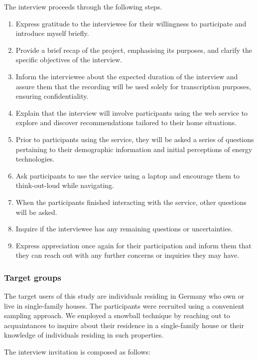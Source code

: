 The interview proceeds through the following steps.
\begin{enumerate}
  \item Express gratitude to the interviewee for their willingness to participate and introduce myself briefly.
  \item Provide a brief recap of the project, emphasising its purposes, and clarify the specific objectives of the interview.
  \item Inform the interviewee about the expected duration of the interview and assure them that the recording will be used solely for transcription purposes, ensuring confidentiality.
  \item Explain that the interview will involve participants using the web service to explore and discover recommendations tailored to their home situations.
  \item Prior to participants using the service, they will be asked a series of questions pertaining to their demographic information and initial perceptions of energy technologies.
  \item Ask participants to use the service using a laptop and encourage them to think-out-loud while navigating.
  \item When the participants finished interacting with the service, other questions will be asked.
  \item Inquire if the interviewee has any remaining questions or uncertainties.
  \item Express appreciation once again for their participation and inform them that they can reach out with any further concerns or inquiries they may have.
\end{enumerate}


\subsubsection{Target groups}

The target users of this study are individuals residing in Germany who own or live in single-family houses.
The participants were recruited using a convenient sampling approach. 
We employed a snowball technique by reaching out to acquaintances to inquire about their residence in a single-family house or their knowledge of individuals residing in such properties. 

The interview invitation is composed as follows:

